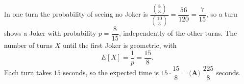 In one turn the probability of seeing no Joker is $\dfrac{\binom83}{\binom{10}3}=\dfrac{56}{120}=\dfrac{7}{15}$, so a turn shows a Joker with probability $p=\dfrac{8}{15}$, independently of the other turns. The number of turns $X$ until the first Joker is geometric, with
\[
E[X]=\dfrac{1}{p}=\dfrac{15}{8} .
\]
Each turn takes $15$ seconds, so the expected time is $15\cdot\dfrac{15}{8}=\boxed{\textbf{(A) }\dfrac{225}{8}}$ seconds.
